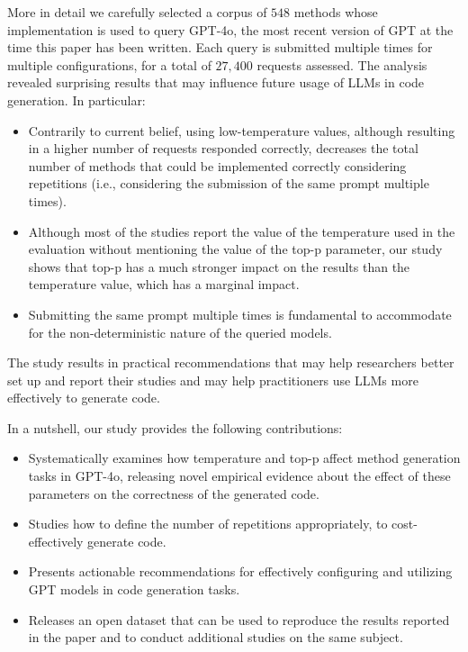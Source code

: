 

More in detail we carefully selected a corpus of $548$ methods whose implementation is used to query GPT-4o, the most recent version of GPT at the time this paper has been written. Each query is submitted multiple times for multiple configurations, for a total of $27,400$ requests assessed. The analysis revealed surprising results that may influence future usage of LLMs in code generation. In particular:
\begin{itemize}
    \item Contrarily to current belief, using low-temperature values, although resulting in a higher number of requests responded correctly, decreases the total number of methods that could be implemented correctly considering repetitions (i.e., considering the submission of the same prompt multiple times).
    \item Although most of the studies report the value of the temperature used in the evaluation without mentioning the value of the top-p parameter, our study shows that top-p has a much stronger impact on the results than the temperature value, which has a marginal impact.
    \item  Submitting the same prompt multiple times is fundamental to accommodate for the non-deterministic nature of the queried models.
\end{itemize}

The study results in practical recommendations that may help researchers better set up and report their studies and may help practitioners use LLMs more effectively to generate code.

In a nutshell, our study provides the following contributions:
\begin{itemize}
\item Systematically examines how temperature and top-p affect method generation tasks in GPT-4o, releasing novel empirical evidence about the effect of these parameters on the correctness of the generated code.

\item Studies how to define the number of repetitions appropriately, to cost-effectively generate code.

\item Presents actionable recommendations for effectively configuring and utilizing GPT models in code generation tasks.

\item Releases an open dataset that can be used to reproduce the results reported in the paper and to conduct additional studies on the same subject.
\end{itemize}

